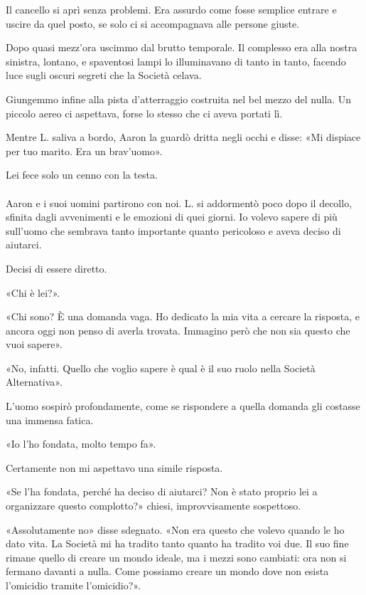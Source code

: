 \documentclass[a4paper,12pt]{book}
\begin{document}
Il cancello si aprì senza problemi. Era assurdo come fosse semplice entrare e
uscire da quel posto, se solo ci si accompagnava alle persone giuste.

Dopo quasi mezz'ora uscimmo dal brutto temporale. Il complesso era alla nostra
sinistra, lontano, e spaventosi lampi lo illuminavano di tanto in tanto, facendo
luce sugli oscuri segreti che la Società celava.

Giungemmo infine alla pista d'atterraggio costruita nel bel mezzo del nulla.
Un piccolo aereo ci aspettava, forse lo stesso che ci aveva portati lì.

Mentre L. saliva a bordo, Aaron la guardò dritta negli occhi e disse: «Mi
dispiace per tuo marito. Era un brav'uomo».

Lei fece solo un cenno con la testa.

\paragraph{}
Aaron e i suoi uomini partirono con noi. L. si addormentò poco dopo il decollo,
sfinita dagli avvenimenti e le emozioni di quei giorni. Io volevo sapere di più
sull'uomo che sembrava tanto importante quanto pericoloso e aveva deciso di
aiutarci.

Decisi di essere diretto.

«Chi è lei?».

«Chi sono? È una domanda vaga. Ho dedicato la mia vita a cercare la risposta,
e ancora oggi non penso di averla trovata. Immagino però che non sia questo che
vuoi sapere».

«No, infatti. Quello che voglio sapere è qual è il suo ruolo nella Società
Alternativa».

L'uomo sospirò profondamente, come se rispondere a quella domanda gli costasse
una immensa fatica.

«Io l'ho fondata, molto tempo fa».

Certamente non mi aspettavo una simile risposta.

«Se l'ha fondata, perché ha deciso di aiutarci? Non è stato proprio lei a
organizzare questo complotto?» chiesi, improvvisamente sospettoso.

«Assolutamente no» disse sdegnato. «Non era questo che volevo quando le ho dato
vita. La Società mi ha tradito tanto quanto ha tradito voi due. Il suo fine
rimane quello di creare un mondo ideale, ma i mezzi sono cambiati: ora non si
fermano davanti a nulla. Come possiamo creare un mondo dove non esista
l'omicidio tramite l'omicidio?».
\end{document}
